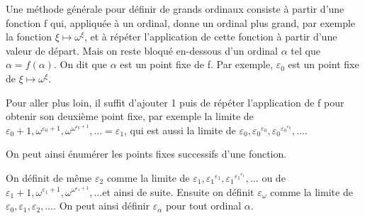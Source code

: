 \documentclass[12pt]{beamer}
\begin{document}
\begin{frame}

Une méthode générale pour définir de grands ordinaux consiste à partir d'une fonction f qui, appliquée à un ordinal, donne un ordinal plus grand, par exemple la fonction \( \xi \mapsto \omega^\xi \), et à répéter l'application de cette fonction à partir d'une valeur de départ. Mais on reste bloqué en-dessous d'un ordinal \( \alpha \) tel que \( \alpha = f(\alpha) \). On dit que \( \alpha \) est un point fixe de f. Par exemple, \( \varepsilon_0 \) est un point fixe de \( \xi \mapsto \omega^\xi \). 

Pour aller plus loin, il suffit d'ajouter 1 puis de répéter l'application de f pour obtenir son deuxième point fixe, par exemple la limite de \( {\varepsilon_0}+1, \omega^{{\varepsilon_0}+1}, \omega^{\omega^{{\varepsilon_0}+1}}, \ldots = \varepsilon_1 \), qui est aussi la limite de \( {\varepsilon_0}, {\varepsilon_0}^{\varepsilon_0}, {\varepsilon_0}^{{\varepsilon_0}^{\varepsilon_0}}, \ldots \).

On peut ainsi énumérer les points fixes successifs d'une fonction.

\end{frame}
\begin{frame}

On définit de même \( \varepsilon_2 \) comme la limite de \( \varepsilon_1, {\varepsilon_1}^{\varepsilon_1}, {\varepsilon_1}^{{\varepsilon_1}^{\varepsilon_1}}, \ldots \) ou de \( \varepsilon_1+1, \omega^{\varepsilon_1+1}, \omega^{\omega^{\varepsilon_1+1}}, \ldots \)et ainsi de suite.
Ensuite on définit \( \varepsilon_\omega \) comme la limite de \( \varepsilon_0, \varepsilon_1, \varepsilon_2, \ldots \).
On peut ainsi définir \( \varepsilon_\alpha \) pour tout ordinal \( \alpha \).

\end{frame}
\end{document}

